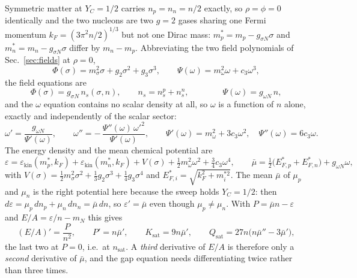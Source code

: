 \documentclass[aps,prc,onecolumn,superscriptaddress,nofootinbib,10pt]{revtex4-2}
\newcommand{\nsat}{n_{\mathrm{sat}}}
\begin{document}
Symmetric matter at $Y_C = 1/2$ carries $n_p = n_n = n/2$ exactly, so
$\rho = \phi = 0$ identically and the two nucleons are two $g = 2$ gases
sharing one Fermi momentum $k_F = (3\pi^2 n/2)^{1/3}$ but not one Dirac mass:
$m^*_p = m_p - g_{\sigma N}\sigma$ and $m^*_n = m_n - g_{\sigma N}\sigma$
differ by $m_n - m_p$. Abbreviating the two field polynomials of
Sec.~\ref{sec:fields} at $\rho = 0$,
%
\begin{equation}
\Phi(\sigma) = m_\sigma^2 \sigma + g_2 \sigma^2 + g_3 \sigma^3 ,
\qquad
\Psi(\omega) = m_\omega^2 \omega + c_3 \omega^3 ,
\end{equation}
%
the field equations are
%
\begin{equation}
\Phi(\sigma) = g_{\sigma N}\, n_s(\sigma, n),
\qquad n_s = n_s^p + n_s^n ,
\qquad\qquad
\Psi(\omega) = g_{\omega N}\, n ,
\label{eq:snmfields}
\end{equation}
%
and the $\omega$ equation contains no scalar density at all, so $\omega$ is a
function of $n$ alone, exactly and independently of the scalar sector:
%
\begin{equation}
\omega' = \frac{g_{\omega N}}{\Psi'(\omega)} ,
\qquad
\omega'' = -\,\frac{\Psi''(\omega)\, \omega'^2}{\Psi'(\omega)} ,
\qquad
\Psi'(\omega) = m_\omega^2 + 3 c_3 \omega^2 ,
\quad
\Psi''(\omega) = 6 c_3 \omega .
\end{equation}
%
The energy density and the mean chemical potential are
%
\begin{equation}
\varepsilon = \varepsilon_{\mathrm{kin}}(m^*_p, k_F)
            + \varepsilon_{\mathrm{kin}}(m^*_n, k_F)
            + V(\sigma) + \tfrac12 m_\omega^2 \omega^2
            + \tfrac34 c_3 \omega^4 ,
\qquad
\bar\mu = \tfrac12 \big( E^{*}_{F,p} + E^{*}_{F,n} \big)
        + g_{\omega N} \omega ,
\end{equation}
%
with $V(\sigma) = \tfrac12 m_\sigma^2\sigma^2 + \tfrac13 g_2 \sigma^3
+ \tfrac14 g_3 \sigma^4$ and $E^*_{F,i} = \sqrt{k_F^2 + m^{*2}_i}$. The mean
$\bar\mu$ of $\mu_p$ and $\mu_n$ is the right potential here because the sweep
holds $Y_C = 1/2$: then $d\varepsilon = \mu_p\, dn_p + \mu_n\, dn_n = \bar\mu\, dn$, so $\varepsilon' = \bar\mu$ even though
$\mu_p \neq \mu_n$. With $P = \bar\mu n - \varepsilon$ and
$E/A = \varepsilon/n - m_N$ this gives
%
\begin{equation}
(E/A)' = \frac{P}{n^2} ,
\qquad
P' = n \bar\mu' ,
\qquad
K_{\mathrm{sat}} = 9 n \bar\mu' ,
\qquad
Q_{\mathrm{sat}} = 27 n \big( n \bar\mu'' - 3 \bar\mu' \big) ,
\label{eq:KQfrommu}
\end{equation}
%
the last two at $P = 0$, i.e.\ at $\nsat$. A \emph{third} derivative of $E/A$
is therefore only a \emph{second} derivative of $\bar\mu$, and the gap
equation needs differentiating twice rather than three times.
\end{document}
